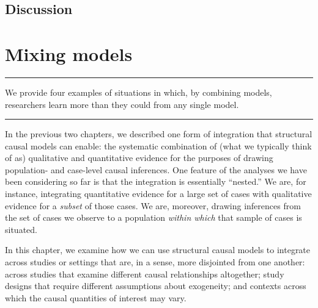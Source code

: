 \documentclass[
  12pt,
]{book}
\begin{document}
\hypertarget{discussion}{%
\section{Discussion}\label{discussion}}

\hypertarget{mm}{%
\chapter{Mixing models}\label{mm}}

\begin{center}\rule{0.5\linewidth}{0.5pt}\end{center}

We provide four examples of situations in which, by combining models, researchers learn more than they could from any single model.

\begin{center}\rule{0.5\linewidth}{0.5pt}\end{center}

In the previous two chapters, we described one form of integration that structural causal models can enable: the systematic combination of (what we typically think of as) qualitative and quantitative evidence for the purposes of drawing population- and case-level causal inferences. One feature of the analyses we have been considering so far is that the integration is essentially ``nested.'' We are, for instance, integrating quantitative evidence for a large set of cases with qualitative evidence for a \emph{subset} of those cases. We are, moreover, drawing inferences from the set of cases we observe to a population \emph{within which} that sample of cases is situated.

In this chapter, we examine how we can use structural causal models to integrate across studies or settings that are, in a sense, more disjointed from one another: across studies that examine different causal relationships altogether; study designs that require different assumptions about exogeneity; and contexts across which the causal quantities of interest may vary.
\end{document}
